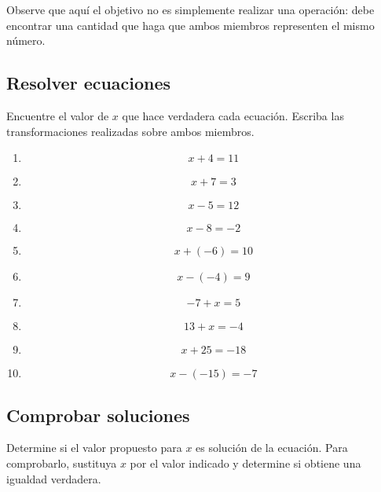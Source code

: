 Observe que aquí el objetivo no es simplemente realizar una operación: debe encontrar una cantidad que haga que ambos miembros representen el mismo número.

\subsection*{Resolver ecuaciones}

Encuentre el valor de \(x\) que hace verdadera cada ecuación. Escriba las transformaciones realizadas sobre ambos miembros.

\begin{enumerate}
\item

\[
x+4=11
\]

\item

\[
x+7=3
\]

\item

\[
x-5=12
\]

\item

\[
x-8=-2
\]

\item

\[
x+(-6)=10
\]

\item

\[
x-(-4)=9
\]

\item

\[
-7+x=5
\]

\item

\[
13+x=-4
\]

\item

\[
x+25=-18
\]

\item

\[
x-(-15)=-7
\]

\end{enumerate}

\subsection*{Comprobar soluciones}

Determine si el valor propuesto para \(x\) es solución de la ecuación. Para comprobarlo, sustituya \(x\) por el valor indicado y determine si obtiene una igualdad verdadera.

